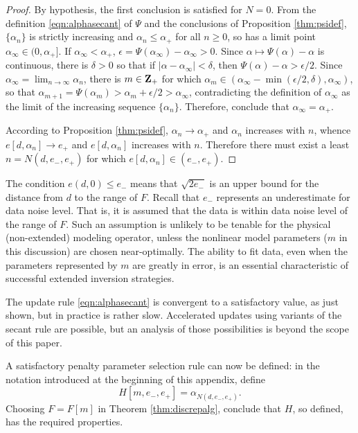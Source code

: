 \begin{proof}
  By hypothesis, the first conclusion is satisfied for $N=0$. From the definition \ref{eqn:alphasecant} of $\Psi$ and the conclusions of Proposition \ref{thm:psidef}, $\{\alpha_n\}$ is strictly increasing and $\alpha_n \le \alpha_+$ for all $n \ge 0$, so has a limit point $\alpha_{\infty} \in (0,\alpha_+]$. If $\alpha_{\infty}<\alpha_+$, $\epsilon = \Psi(\alpha_{\infty})-\alpha_{\infty} >0$. Since $\alpha \mapsto \Psi(\alpha)-\alpha$ is continuous, there is $\delta>0$ so that if $|\alpha-\alpha_{\infty}|<\delta$, then $\Psi(\alpha)-\alpha >\epsilon/2$. Since $\alpha_{\infty}=\lim_{n\rightarrow \infty}\alpha_n$, there is $m \in {\bf Z}_+$ for which $\alpha_m \in (\alpha_{\infty}-\min(\epsilon/2,\delta),\alpha_{\infty})$, so that $\alpha_{m+1} = \Psi(\alpha_m) >\alpha_m + \epsilon/2>\alpha_{\infty}$, contradicting the definition of $\alpha_{\infty}$ as the limit of the increasing sequence $\{\alpha_n\}$. Therefore, conclude that $\alpha_{\infty}=\alpha_+$.
  
  According to Proposition \ref{thm:psidef}, $\alpha_n \rightarrow \alpha_+$ and $\alpha_n$ increases with $n$,  whence $e[d,\alpha_n] \rightarrow e_+$ and $e[d,\alpha_n]$ increases with $n$. Therefore there must exist a least $n = N(d,e_-,e_+)$ for which $e[d,\alpha_n] \in (e_-,e_+)$.
\end{proof}

 The condition $e(d,0)\le e_-$ means that $\sqrt{2e_-}$ is an upper bound for the distance from $d$ to the range of $F$. Recall that $e_-$ represents an underestimate for data noise level. That is, it is assumed that the data is within data noise level of the range of $F$. Such an assumption is unlikely to be tenable for the physical (non-extended) modeling operator, unless the nonlinear model parameters ($m$ in this discussion) are chosen near-optimally. The ability to fit data, even when the parameters represented by $m$ are greatly in error, is an essential characteristic of successful extended inversion strategies. 

 The update rule \ref{eqn:alphasecant} is convergent to a satisfactory value, as just shown, but in practice is rather slow. Accelerated updates using variants of the secant rule are possible, but an analysis of those possibilities is beyond the scope of this paper. 

A satisfactory penalty parameter selection rule can now be defined: in the notation introduced at the beginning of this appendix, define 
\begin{equation}
    H[m,e_-,e_+] = \alpha_{N(d,e_-,e_+)}.
\end{equation}
Choosing $F=F[m]$ in Theorem \ref{thm:discrepalg}, conclude that $H$, so defined, has the required properties.

